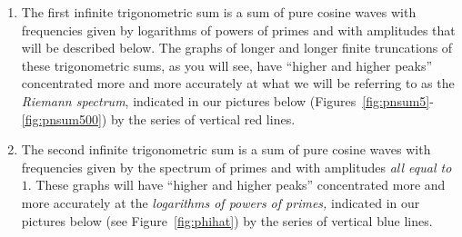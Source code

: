 \documentclass[openany]{book}
\theoremstyle{plain}
\theoremstyle{definition}
\begin{document}
\begin{enumerate} 
\item The first infinite trigonometric sum is a sum of pure cosine
  waves with frequencies given by logarithms of powers of primes and
  with amplitudes that will be described below.  The graphs of 
longer and longer finite  truncations of  these trigonometric sums, as you will see,  
  have ``higher and higher peaks'' concentrated more and more
  accurately at what we will be referring to as the {\it Riemann spectrum}, indicated
  in our pictures below (Figures~\ref{fig:pnsum5}-\ref{fig:pnsum500})
  by the series of vertical red lines.
 
\item The second infinite trigonometric sum is a sum of pure cosine
  waves with frequencies given by the spectrum of primes and with
  amplitudes {\it all equal to $1$}.  These graphs will have ``higher
  and higher peaks'' concentrated more and more accurately at the {\it
    logarithms of powers of primes,} indicated in our pictures below
  (see Figure~\ref{fig:phihat}) by the series of vertical blue lines.
\end{enumerate}
 
\end{document}
